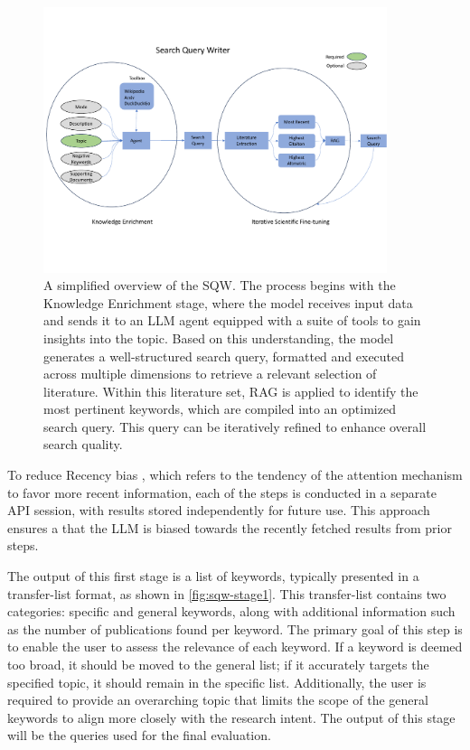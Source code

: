 \begin{figure}[!h]
	\centering
	\includegraphics[width=380px]{pics/sqw-overview.pdf}
	\caption[Search Query Writer]{A simplified overview of the SQW. The process begins with the Knowledge Enrichment stage, where the model receives input data and sends it to an LLM agent equipped with a suite of tools to gain insights into the topic. Based on this understanding, the model generates a well-structured search query, formatted and executed across multiple dimensions to retrieve a relevant selection of literature. Within this literature set, RAG is applied to identify the most pertinent keywords, which are compiled into an optimized search query. This query can be iteratively refined to enhance overall search quality.}
	\label{fig:sqw-overview}
\end{figure}

To reduce Recency bias \autocite{Deldjoo2024}, which refers to the tendency of the attention mechanism to favor more recent information, each of the steps is conducted in a separate API session, with results stored independently for future use. This approach ensures a that the LLM is biased towards the recently fetched results from prior steps.

The output of this first stage is a list of keywords, typically presented in a transfer-list format, as shown in \autoref{fig:sqw-stage1}. This transfer-list contains two categories: specific and general keywords, along with additional information such as the number of publications found per keyword. The primary goal of this step is to enable the user to assess the relevance of each keyword. If a keyword is deemed too broad, it should be moved to the general list; if it accurately targets the specified topic, it should remain in the specific list. Additionally, the user is required to provide an overarching topic that limits the scope of the general keywords to align more closely with the research intent. The output of this stage will be the queries used for the final evaluation.



